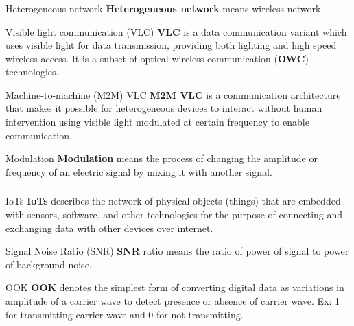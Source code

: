 \documentclass{beamer}
\begin{document}
\begin{frame}
  \frametitle{}
  \begin{block}{Heterogeneous network}
    \textbf{Heterogeneous network} means wireless network.
  \end{block}
   \begin{block}{Visible light communication (VLC)}
   \textbf{VLC} is a data communication variant which uses visible light for data transmission, providing both lighting and high speed wireless access. It is a subset of optical wireless communication (\textbf{OWC}) technologies.
  \end{block}
  \begin{block}{Machine-to-machine (M2M) VLC}
    \textbf{M2M VLC} is a communication architecture that makes it possible for heterogeneous devices to interact without human intervention using visible light modulated at certain frequency to enable communication.
  \end{block}
  \begin{block}{Modulation}
  \textbf{Modulation} means the process of changing the amplitude or frequency of an electric signal by mixing it with another signal.
  \end{block}
\end{frame}

\begin{frame}
  \frametitle{}
  \begin{block}{IoTs}
  \textbf{IoTs} describes the network of physical objects (things) that are embedded with sensors, software, and other technologies for the purpose of connecting and exchanging data with other devices over internet.
  \end{block}
  \begin{block}{Signal Noise Ratio (SNR)}
  \textbf{SNR} ratio means the ratio of power of signal to power of background noise.
  \end{block}
  \begin{block}{OOK}
  \textbf{OOK} denotes the simplest form of converting digital data as variations in amplitude of a carrier wave to detect presence or absence of carrier wave. Ex: 1 for transmitting carrier wave and 0 for not transmitting.
  \end{block}
\end{frame}
\end{document}
